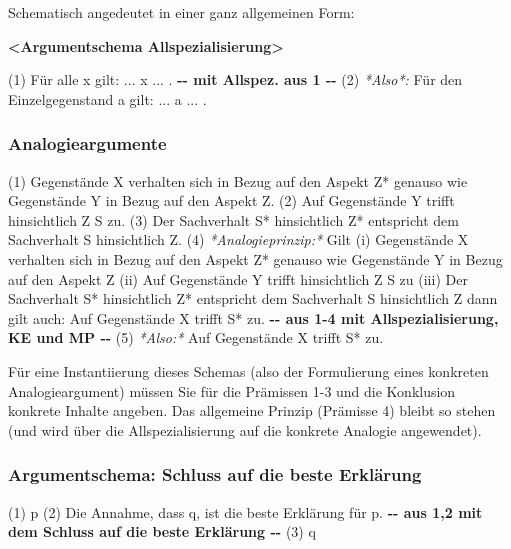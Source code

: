 \documentclass[
  english,
  a4paper,
]{article}
\newenvironment{Shaded}{\begin{snugshade}}{\end{snugshade}}
\newcommand{\AlertTok}[1]{\textcolor[rgb]{0.02,0.51,0.79}{\textbf{#1}}}
\newcommand{\ErrorTok}[1]{\textcolor[rgb]{0.02,0.51,0.79}{#1}}
\newcommand{\FloatTok}[1]{\textcolor[rgb]{0.12,0.11,0.11}{\textit{#1}}}
\newcommand{\NormalTok}[1]{\textcolor[rgb]{0.12,0.11,0.11}{#1}}
\newcommand{\WarningTok}[1]{\textcolor[rgb]{0.46,0.73,0.89}{\textbf{#1}}}
\renewenvironment{Shaded}{\centering \begin{mdframed}[style=codedefault]}{\end{mdframed}}%
\newenvironment{Shaded}{\centering \begin{mdframed}[style=codedefault]}{\end{mdframed}}%
\begin{document}
Schematisch angedeutet in einer ganz allgemeinen Form:

\begin{Shaded}
\begin{Highlighting}[]
\AlertTok{\textless{}Argumentschema Allspezialisierung\textgreater{}}

\ErrorTok{(1)}\NormalTok{ Für alle x gilt: ... x ... .}
\WarningTok{{-}{-} mit Allspez. aus 1 {-}{-}}
\ErrorTok{(2)}\FloatTok{ *Also*:}\NormalTok{ Für den Einzelgegenstand a gilt: ... a ... .}
\end{Highlighting}
\end{Shaded}

\subsubsection{Analogieargumente}\label{analogieargumente}

\begin{Shaded}
\begin{Highlighting}[]
\ErrorTok{(1)}\NormalTok{ Gegenstände X verhalten sich in Bezug auf den Aspekt Z* genauso wie}
\NormalTok{    Gegenstände Y in Bezug auf den Aspekt Z.}
\ErrorTok{(2)}\NormalTok{ Auf Gegenstände Y trifft hinsichtlich Z S zu.}
\ErrorTok{(3)}\NormalTok{ Der Sachverhalt S* hinsichtlich Z* entspricht dem Sachverhalt S }
\NormalTok{    hinsichtlich Z.}
\ErrorTok{(4)}\FloatTok{ *Analogieprinzip:* }\NormalTok{Gilt}
\NormalTok{      (i) Gegenstände X verhalten sich in Bezug auf den Aspekt Z* genauso wie}
\NormalTok{      Gegenstände Y in Bezug auf den Aspekt Z}
\NormalTok{      (ii) Auf Gegenstände Y trifft hinsichtlich Z S zu}
\NormalTok{      (iii) Der Sachverhalt S* hinsichtlich Z* entspricht dem Sachverhalt S }
\NormalTok{      hinsichtlich Z}
\NormalTok{    dann gilt auch: Auf Gegenstände X trifft S* zu.}
\WarningTok{{-}{-} aus 1{-}4 mit Allspezialisierung, KE und MP {-}{-}}
\ErrorTok{(5)}\FloatTok{ *Also:* }\NormalTok{Auf Gegenstände X trifft S* zu.}
\end{Highlighting}
\end{Shaded}

Für eine Instantiierung dieses Schemas (also der Formulierung eines
konkreten Analogieargument) müssen Sie für die Prämissen 1-3 und die
Konklusion konkrete Inhalte angeben. Das allgemeine Prinzip (Prämisse 4)
bleibt so stehen (und wird über die Allspezialisierung auf die konkrete
Analogie angewendet).

\subsubsection{Argumentschema: Schluss auf die beste
Erklärung}\label{argumentschema-schluss-auf-die-beste-erkluxe4rung}

\begin{Shaded}
\begin{Highlighting}[]
\ErrorTok{(1)}\NormalTok{ p}
\ErrorTok{(2)}\NormalTok{ Die Annahme, dass q, ist die beste Erklärung für p.}
\WarningTok{{-}{-} aus 1,2 mit dem Schluss auf die beste Erklärung {-}{-}}
\ErrorTok{(3)}\NormalTok{ q}
\end{Highlighting}
\end{Shaded}
\end{document}
